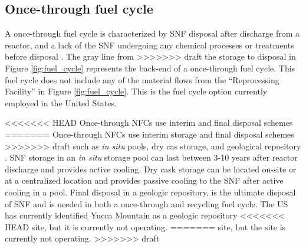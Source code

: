 \subsection{Once-through fuel cycle}
A once-through fuel cycle is characterized by \gls{SNF} disposal
after discharge from a reactor, and a lack of the 
\gls{SNF} undergoing any chemical processes 
or treatments before disposal \cite{rodriguez-penalonga_review_2017}. 
The gray line from 
>>>>>>> draft
the storage to disposal in Figure \ref{fig:fuel_cycle} represents 
the back-end of a once-through fuel cycle. This fuel cycle does 
not include any of the material flows from the ``Reprocessing Facility'' 
in Figure \ref{fig:fuel_cycle}.
This is the fuel cycle option currently employed in the 
United States. 

<<<<<<< HEAD
Once-through \glspl{NFC} use interim and final disposal schemes
=======
Once-through \glspl{NFC} use interim storage and final disposal schemes
>>>>>>> draft
such as \textit{in situ} pools, dry cas storage, and geological 
repository \cite{rodriguez-penalonga_review_2017}. \gls{SNF} storage in 
an \textit{in situ} storage pool can last between 3-10 years after 
reactor discharge \cite{rodriguez-penalonga_review_2017}
and provides active cooling. Dry cask storage can be located 
on-site or at a centralized location and provides passive 
cooling to the \gls{SNF} after active cooling in a pool. 
Final disposal in a geologic repository, is the ultimate disposal 
of \gls{SNF} and 
is needed in both a once-through and recycling fuel cycle. The 
US has currently identified Yucca Mountain as a geologic repository 
<<<<<<< HEAD
site, but it is currently not operating.  
=======
site, but the site is currently not operating.  
>>>>>>> draft

